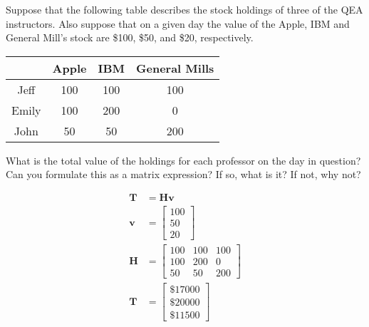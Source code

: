 Suppose that the following table describes the stock holdings of three of the QEA instructors. Also suppose that on a given day the value of the Apple, IBM and General Mill’s stock are \$100, \$50, and \$20, respectively. 

\begin{center}
    \begin{tabular}{| c | c c c|} 
        \hline
        & Apple & IBM & General Mills \\
        \hline
        Jeff  & 100 & 100 & 100 \\ 
        Emily & 100 & 200 &   0 \\
        John  &  50 &  50 & 200 \\
        \hline
    \end{tabular}
\end{center}

What is the total value of the holdings for each professor on the day in question? Can you formulate this as a matrix expression? If so, what is it? If not, why not?

\begin{solution}
    \begin{align*}
        \boldsymbol{T} &= \boldsymbol{Hv} \\
        \boldsymbol{v} &= \begin{bmatrix}
            100 \\ 50 \\ 20
        \end{bmatrix} \\
        \boldsymbol{H} &= \begin{bmatrix}
            100 & 100 & 100 \\
            100 & 200 & 0 \\
            50 & 50 & 200
        \end{bmatrix} \\
        \boldsymbol{T} &= \begin{bmatrix}
            \$17000 \\
            \$20000 \\
            \$11500
        \end{bmatrix}
    \end{align*}
\end{solution}